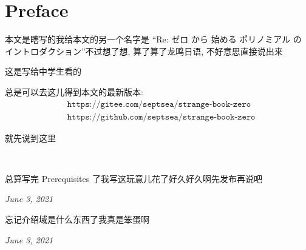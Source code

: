 \section*{Preface}

本文是瞎写的\period 我给本文的另一个名字是 ``Re: ゼロ から 始める ポリノミアル の イントロダクション''\period 不过想了想, 算了算了\period 龙鸣日语, 不好意思直接说出来\period

这是写给中学生看的\period

总是可以去这儿得到本文的最新版本:
\begin{align*}
     & \texttt{https://gitee.com/septsea/strange-book-zero}  \\
     & \texttt{https://github.com/septsea/strange-book-zero}
\end{align*}

就先说到这里\period

\ \

\providecommand{\appendDate}{}
\renewcommand{\appendDate}[1]{\par \hfill {\itshape \sffamily #1}}

\begin{remark}
    总算写完 Prerequisites 了\period 我写这玩意儿花了好久好久啊\period 先发布再说吧\period
    \appendDate{June 3, 2021}
\end{remark}

\begin{remark}
    忘记介绍域是什么东西了\period 我真是笨蛋啊\period
    \appendDate{June 3, 2021}
\end{remark}
